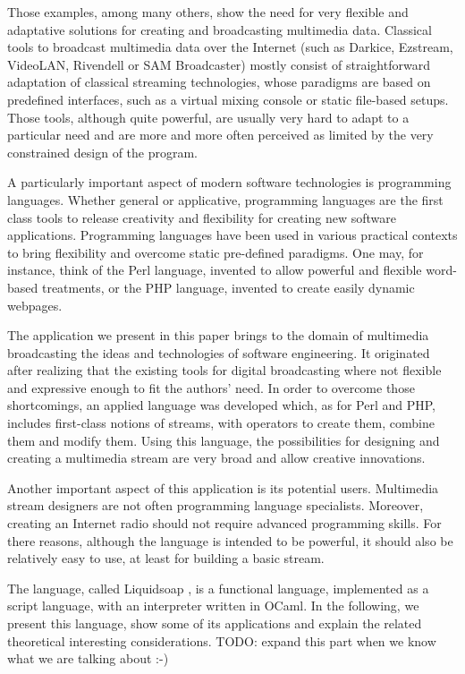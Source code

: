 \documentclass{llncs}
\newcommand{\liquidsoap}{Liquidsoap}
\begin{document}
Those examples, among many others, show the need for very flexible and
adaptative solutions for creating and broadcasting multimedia data. Classical
tools to broadcast multimedia data over the Internet (such as Darkice, Ezstream,
VideoLAN, Rivendell or SAM Broadcaster) mostly consist of straightforward
adaptation of classical streaming technologies, whose paradigms are based on
predefined interfaces, such as a virtual mixing console or static file-based
setups. Those tools, although quite powerful, are usually very hard to adapt to
a particular need and are more and more often perceived as limited by the very
constrained design of the program.

A particularly important aspect of modern software technologies is programming
languages. Whether general or applicative, programming languages are the first 
class tools to release creativity and flexibility for creating new software applications.
Programming languages have been used in various practical contexts to bring flexibility
and overcome static pre-defined paradigms. One may, for instance, think of the Perl 
language, invented to allow powerful and flexible word-based treatments, or the PHP
language, invented to create easily dynamic webpages.

The application we present in this paper brings to the domain of multimedia
broadcasting the ideas and technologies of software engineering. It originated 
after realizing that the existing tools for digital broadcasting where not flexible
and expressive enough to fit the authors' need. In order to overcome those shortcomings,
an applied language was developed which, as for Perl and PHP, includes first-class
notions of streams, with operators to create them, combine them and modify them.
Using this language, the possibilities for designing and creating a multimedia stream
are very broad and allow creative innovations.

Another important aspect of this application is its potential users. Multimedia stream 
designers are not often programming language specialists. Moreover, creating an Internet 
radio should not require advanced programming skills.
For there reasons, although the language is intended to be powerful, it should 
also be relatively easy to use, at least for building a basic stream.

The language, called \liquidsoap{} \cite{liquidsoap}, is a functional language, implemented as 
a script language, with an interpreter written in OCaml. In the following,
we present this language, show some of its applications and explain the 
related theoretical interesting considerations.
TODO: expand this part when we know what we are talking about :-)
\end{document}

